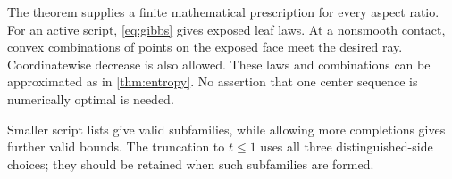 The theorem supplies a finite mathematical prescription for every
aspect ratio.
For an active script, \eqref{eq:gibbs} gives exposed leaf laws.
At a nonsmooth contact, convex combinations of points on the exposed
face meet the desired ray.  Coordinatewise decrease is also allowed.
These laws and combinations can be approximated as in
\cref{thm:entropy}.
No assertion that one center sequence is numerically optimal is needed.

Smaller script lists give valid subfamilies, while allowing more
completions gives further valid bounds.
The truncation to \(t\le1\) uses all three distinguished-side choices;
they should be retained when such subfamilies are formed.
